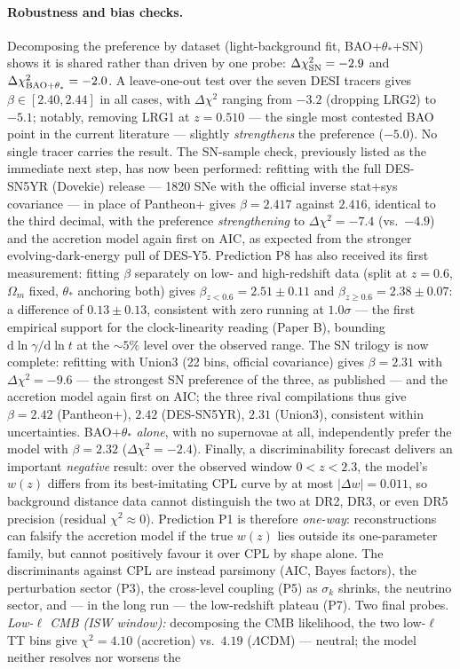 \documentclass[11pt]{article}
\begin{document}
\paragraph{Robustness and bias checks.} Decomposing the preference by dataset (light-background fit, BAO+$\theta_*$+SN) shows it is shared rather than driven by one probe: $\Delta\chi^2_{\rm SN} = -2.9$ and $\Delta\chi^2_{\rm BAO+\theta_*} = -2.0$. A leave-one-out test over the seven DESI tracers gives $\beta \in [2.40, 2.44]$ in all cases, with $\Delta\chi^2$ ranging from $-3.2$ (dropping LRG2) to $-5.1$; notably, removing LRG1 at $z=0.510$ --- the single most contested BAO point in the current literature --- slightly \emph{strengthens} the preference ($-5.0$). No single tracer carries the result. The SN-sample check, previously listed as the immediate next step, has now been performed: refitting with the full DES-SN5YR (Dovekie) release --- 1820 SNe with the official inverse stat+sys covariance --- in place of Pantheon+ gives $\beta = 2.417$ against $2.416$, identical to the third decimal, with the preference \emph{strengthening} to $\Delta\chi^2 = -7.4$ (vs.\ $-4.9$) and the accretion model again first on AIC, as expected from the stronger evolving-dark-energy pull of DES-Y5. Prediction P8 has also received its first measurement: fitting $\beta$ separately on low- and high-redshift data (split at $z = 0.6$, $\Omega_m$ fixed, $\theta_*$ anchoring both) gives $\beta_{z<0.6} = 2.51 \pm 0.11$ and $\beta_{z\geq0.6} = 2.38 \pm 0.07$: a difference of $0.13 \pm 0.13$, consistent with zero running at $1.0\sigma$ --- the first empirical support for the clock-linearity reading (Paper B), bounding $\mathrm{d}\ln\gamma/\mathrm{d}\ln t$ at the $\sim5\%$ level over the observed range. The SN trilogy is now complete: refitting with Union3 (22 bins, official covariance) gives $\beta = 2.31$ with $\Delta\chi^2 = -9.6$ --- the strongest SN preference of the three, as published --- and the accretion model again first on AIC; the three rival compilations thus give $\beta = 2.42$ (Pantheon+), $2.42$ (DES-SN5YR), $2.31$ (Union3), consistent within uncertainties. BAO+$\theta_*$ \emph{alone}, with no supernovae at all, independently prefer the model with $\beta = 2.32$ ($\Delta\chi^2 = -2.4$). Finally, a discriminability forecast delivers an important \emph{negative} result: over the observed window $0 < z < 2.3$, the model's $w(z)$ differs from its best-imitating CPL curve by at most $|\Delta w| = 0.011$, so background distance data cannot distinguish the two at DR2, DR3, or even DR5 precision (residual $\chi^2 \approx 0$). Prediction P1 is therefore \emph{one-way}: reconstructions can falsify the accretion model if the true $w(z)$ lies outside its one-parameter family, but cannot positively favour it over CPL by shape alone. The discriminants against CPL are instead parsimony (AIC, Bayes factors), the perturbation sector (P3), the cross-level coupling (P5) as $\sigma_k$ shrinks, the neutrino sector, and --- in the long run --- the low-redshift plateau (P7). Two final probes. \emph{Low-$\ell$ CMB (ISW window):} decomposing the CMB likelihood, the two low-$\ell$ TT bins give $\chi^2 = 4.10$ (accretion) vs.\ $4.19$ ($\Lambda$CDM) --- neutral; the model neither resolves nor worsens the 
\end{document}
